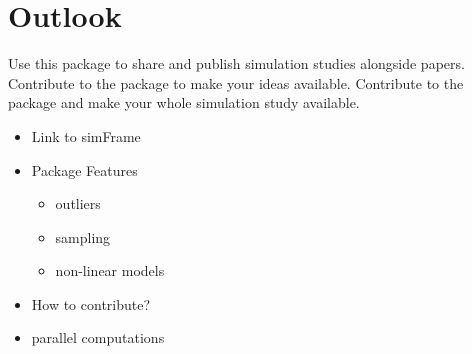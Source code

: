 \documentclass[article]{ajs}
\begin{document}
  
\section{Outlook}
Use this package to share and publish simulation studies alongside papers. Contribute to the package to make your ideas available. Contribute to the package and make your whole simulation study available. 
\begin{itemize}
	\item Link to simFrame
	\item Package Features
	\begin{itemize}
		\item outliers
		\item sampling
		\item non-linear models
	\end{itemize}
	\item How to contribute?
	\item parallel computations
\end{itemize}


%

\end{document}
